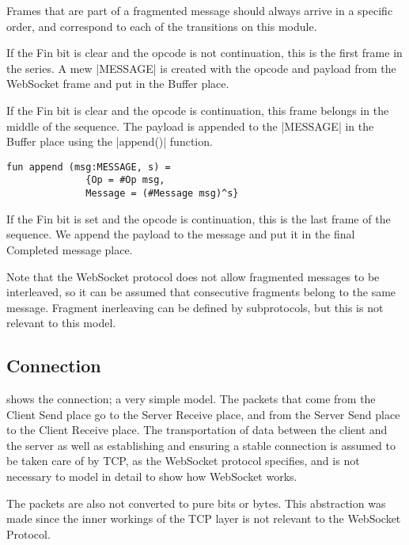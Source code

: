 			Frames that are part of a fragmented message should always arrive in a
			specific order, and correspond to each of the transitions on this module. 
			
			If the Fin bit is clear and the opcode is not continuation, this is the first
			frame in the series. A mew |MESSAGE| is created with the opcode and
			payload from the WebSocket frame and put in the Buffer place.
			
			If the Fin bit is clear and the opcode is continuation, this frame belongs in
			the middle of the sequence. The payload is appended to the
			|MESSAGE| in the Buffer place using the |append()|
			function.
			
			\begin{lstlisting}[label=lst:append,caption=append,gobble=3]
			fun append (msg:MESSAGE, s) = 
			  {Op = #Op msg,
			  Message = (#Message msg)^s}
			\end{lstlisting}
			
			If the Fin bit is set and the opcode is continuation, this is the last frame
			of the sequence. We append the payload to the message and put it in the final
			Completed message place. 
			
			Note that the WebSocket protocol does not allow fragmented messages to be
			interleaved, so it can be assumed that consecutive fragments belong to the
			same message. Fragment inerleaving can be defined by subprotocols, but this
			is not relevant to this model.
			
\subsection{Connection}

	
	 shows the connection; a very simple model. The packets that
	come from the Client Send place go to the Server Receive place, and from the
	Server Send place to the Client Receive place. The transportation of data
	between the client and the server as well as establishing and ensuring a
	stable connection is assumed to be taken care of by TCP, as the WebSocket
	protocol specifies, and is not necessary to model in detail to show how WebSocket works. 
	
	The packets are also not converted to pure bits or bytes. This abstraction was
	made since the inner workings of the TCP layer is not relevant to the WebSocket
	Protocol.

